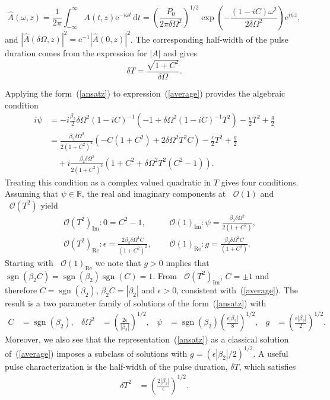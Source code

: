 \documentclass[12pt]{article}
\providecommand{\df}{\textrm{d}}
\providecommand{\bigO}[1]{\ensuremath{\mathop{}\mathopen{}\mathcal{O}\mathopen{}\left(#1\right)}}
\DeclareMathOperator{\sgn}{sgn}
\begin{document}
\[
	\hat{A}(\omega,z) = \frac{1}{2\pi}\int_{-\infty}^\infty A(t,z) \textrm{e}^{-i\omega t}\, \df t
	= \left(\frac{P_0}{2\pi\delta \Omega^2}\right)^{1/2}
	\exp\left(-\frac{(1-i C)\omega^2}{2\delta \Omega^2}\right) \textrm{e}^{i\psi z},
\]
and $|\hat{A}(\delta\Omega,z)|^2 = \textrm{e}^{-1}|\hat{A}(0,z)|^2$. The corresponding half-width of the pulse duration comes from the expression for $|A|$ and gives
\begin{equation}
\label{duration}
	\delta T = \frac{\sqrt{1+C^2}}{\delta \Omega}.
\end{equation}

Applying the form~(\ref{ansatz}) to expression~(\ref{average}) provides the algebraic condition
\begin{align*}
	i\psi &= -i\frac{\beta_2}{2}\delta\Omega^2(1-iC)^{-1}
	\left(-1 + \delta\Omega^2(1-iC)^{-1}T^2\right)-\frac{\epsilon}{2}T^2 + \frac{g}{2} \\
	&= \frac{\beta_2\delta\Omega^2}{2(1+C^2)^2}(-C(1+C^2)+2\delta\Omega^2 T^2C) -\frac{\epsilon}{2}T^2 + \frac{g}{2}\\
	& \quad + i\frac{\beta_2\delta\Omega^2}{2(1+C^2)^2}(1+C^2 + \delta\Omega^2 T^2(C^2-1)).
\end{align*}
Treating this condition as a complex valued quadratic in $T$ gives four conditions. Assuming that $\psi\in\mathbb{R}$, the real and imaginary components at $\bigO{1}$ and $\bigO{T^2}$ yield
\begin{align*}
	&\bigO{T^2}_{\textrm{Im}}: 0 = C^2 - 1, &
	&\bigO{1}_{\textrm{Im}}: \psi = \frac{\beta_2\delta\Omega^2}{2(1+C^2)}, \\
	&\bigO{T^2}_{\textrm{Re}}: \epsilon = \frac{2\beta_2\delta\Omega^4C}{(1+C^2)^2}, &
	&\bigO{1}_{\textrm{Re}}: g = \frac{\beta_2\delta\Omega^2C}{(1+C^2)}.
\end{align*}
Starting with $\bigO{1}_{\textrm{Re}}$ we note that $g > 0$ implies that $\sgn(\beta_2 C) = \sgn(\beta_2)\sgn(C) = 1$. From $\bigO{T^2}_{\textrm{Im}}$, $C = \pm 1$ and therefore $C = \sgn(\beta_2)$, $\beta_2 C = |\beta_2|$ and $\epsilon > 0$, consistent with~(\ref{average}). The result is a two parameter family of solutions of the form~(\ref{ansatz}) with
\begin{align*}
	C &= \sgn(\beta_2),&
	\delta\Omega^2 &= \left(\frac{2\epsilon}{|\beta_2|}\right)^{1/2},&
	\psi &= \sgn(\beta_2)\left(\frac{\epsilon|\beta_2|}{8}\right)^{1/2},&
	g &= \left(\frac{\epsilon|\beta_2|}{2}\right)^{1/2}.
\end{align*}
Moreover, we also see that the representation~(\ref{ansatz}) as a classical solution of~(\ref{average}) imposes a subclass of solutions with $g = \left(\epsilon|\beta_2|/2\right)^{1/2}$. A useful pulse characterization is the half-width of the pulse duration, $\delta T$, which satisfies
\begin{align*}
	\delta T^2 &= \left(\frac{2|\beta_2|}{\epsilon}\right)^{1/2}.
\end{align*}
\end{document}
